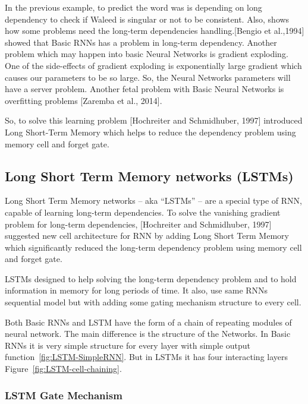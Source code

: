  In the previous example, to predict the word was is depending on long dependency to check if Waleed is singular or not to be consistent. Also, shows how some problems need the long-term dependencies handling.[Bengio et al.,1994]\cite{Bengio_ et_ al} showed that Basic RNNs has a problem in long-term dependency.  Another problem which may happen into basic Neural Networks is gradient exploding. One of the side-effects of gradient exploding is exponentially large gradient which causes our parameters to be so large. So, the Neural Networks parameters will have a server problem. Another fetal problem with Basic Neural Networks is overfitting problems [Zaremba et al., 2014]\cite{Zaremba_et_al}.
 
 So, to solve this learning problem [Hochreiter and Schmidhuber, 1997] introduced Long Short-Term Memory which helps to reduce the dependency problem using memory cell and forget gate.

\subsection{Long Short Term Memory networks (LSTMs)}\label{sec:LSTM}


Long Short Term Memory networks – aka “LSTMs” – are a special type of RNN, capable of learning long-term dependencies. To solve the vanishing gradient problem for long-term dependencies, [Hochreiter and Schmidhuber, 1997]\cite{Hochreiter} suggested new cell architecture for RNN by adding Long Short Term Memory which significantly reduced the long-term dependency problem using memory cell and forget gate.

 LSTMs designed to help solving the long-term dependency problem and to hold information in memory for long periods of time. It also, use same RNNs sequential model but with adding some gating mechanism structure to every cell.

 Both Basic RNNs and LSTM have the form of a chain of repeating modules of neural network. The main difference is the structure of the Networks.%
%
In Basic RNNs it is very simple structure for every layer with simple output function~\ref{fig:LSTM-SimpleRNN}. But in LSTMs it has four interacting layers Figure~\ref{fig:LSTM-cell-chaining}.%
%
\subsubsection{LSTM Gate Mechanism}

